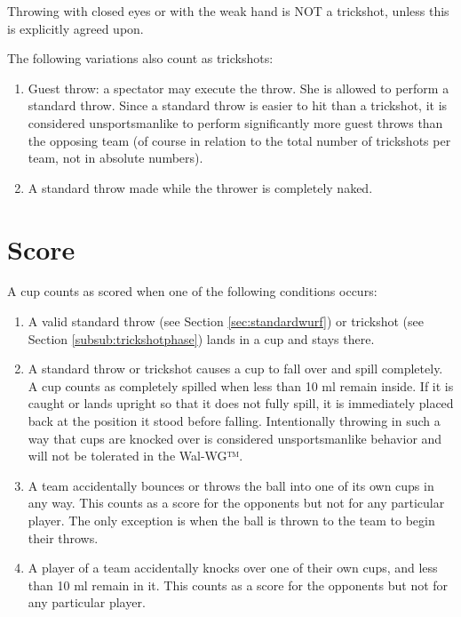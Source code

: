 \documentclass[a5paper, 12pt]{book}
\begin{document}
Throwing with closed eyes or with the weak hand is NOT a trickshot, unless this is explicitly agreed upon.  

The following variations also count as trickshots:

\begin{enumerate} [(1)]
    \item Guest throw: a spectator may execute the throw. She is allowed to perform a standard throw. Since a standard throw is easier to hit than a trickshot, it is considered unsportsmanlike to perform significantly more guest throws than the opposing team (of course in relation to the total number of trickshots per team, not in absolute numbers).

    \item A standard throw made while the thrower is completely naked.
\end{enumerate}

\section{Score}\label{sec:treffer}
A cup counts as scored when one of the following conditions occurs:

\begin{enumerate}
    \item A valid standard throw (see Section \ref{sec:standardwurf}) or trickshot (see Section \ref{subsub:trickshotphase}) lands in a cup and stays there.
    \item A standard throw or trickshot causes a cup to fall over and spill completely.  
    A cup counts as completely spilled when less than 10 ml remain inside. If it is caught or lands upright so that it does not fully spill, it is immediately placed back at the position it stood before falling.  
    Intentionally throwing in such a way that cups are knocked over is considered unsportsmanlike behavior and will not be tolerated in the Wal-WG™.
    \item A team accidentally bounces or throws the ball into one of its own cups in any way.  
    This counts as a score for the opponents but not for any particular player.  
    The only exception is when the ball is thrown to the team to begin their throws.
    \item A player of a team accidentally knocks over one of their own cups, and less than 10 ml remain in it.  
    This counts as a score for the opponents but not for any particular player.
\end{enumerate}
\end{document}
